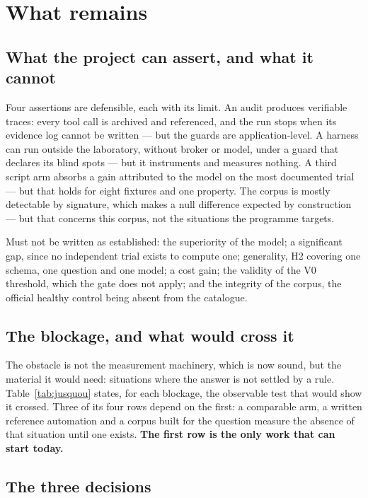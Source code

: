 \section{What remains}
\label{sec:reste}

\subsection{What the project can assert, and what it cannot}

Four assertions are defensible, each with its limit. An audit produces verifiable
traces: every tool call is archived and referenced, and the run stops when its
evidence log cannot be written --- but the guards are application-level. A harness
can run outside the laboratory, without broker or model, under a guard that
declares its blind spots --- but it instruments and measures nothing. A third
script arm absorbs a gain attributed to the model on the most documented trial ---
but that holds for eight fixtures and one property. The corpus is mostly
detectable by signature, which makes a null difference expected by construction ---
but that concerns this corpus, not the situations the programme targets.

Must not be written as established: the superiority of the model; a significant
gap, since no independent trial exists to compute one; generality, H2 covering
one schema, one question and one model; a cost gain; the validity of the V0
threshold, which the gate does not apply; and the integrity of the corpus, the
official healthy control being absent from the catalogue.

\subsection{The blockage, and what would cross it}

The obstacle is not the measurement machinery, which is now sound, but the
material it would need: situations where the answer is not settled by a rule.
Table~\ref{tab:jusquou} states, for each blockage, the observable test that would
show it crossed. Three of its four rows depend on the first: a comparable arm, a
written reference automation and a corpus built for the question measure the
absence of that situation until one exists. \textbf{The first row is the only
work that can start today.}



\subsection{The three decisions}

